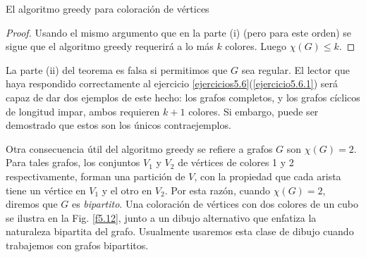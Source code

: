 \documentclass[11pt,spanish,makeidx]{amsbook}
\theoremstyle{definition}
\theoremstyle{remark}
\begin{document}
\begin{section}{El algoritmo greedy para coloración de vértices}
\begin{proof}
Usando el mismo argumento que en la parte (i) (pero para este orden) se sigue que el algoritmo greedy requerirá a lo más $k$ colores. Luego $\chi(G)\le k$.
\end{proof}

La parte (ii) del teorema es falsa si permitimos que $G$ sea regular. El lector que haya respondido correctamente al ejercicio \ref{ejercicios5.6}(\ref{ejercicio5.6.1}) será capaz de dar dos ejemplos de este hecho: los grafos completos, y los grafos cíclicos de longitud impar, ambos requieren $k+1$ colores. Si embargo, puede ser demostrado que estos son los únicos contraejemplos.

Otra consecuencia útil del algoritmo greedy se refiere a grafos $G$ son $\chi(G)=2$. Para tales grafos, los conjuntos $V_1$ y $V_2$ de vértices de colores 1 y 2 respectivamente, forman una partición de $V$, con la propiedad que cada arista tiene un vértice en $V_1$ y el otro en $V_2$. Por esta razón, cuando $\chi(G)=2$, diremos que $G$ es {\em bipartito}.   Una coloración de vértices con dos colores de un cubo se ilustra en la Fig. \ref{f5.12}, junto a un dibujo alternativo que enfatiza la naturaleza bipartita del grafo. Usualmente usaremos esta clase de dibujo cuando trabajemos con grafos bipartitos.


\end{section}
\end{document}
